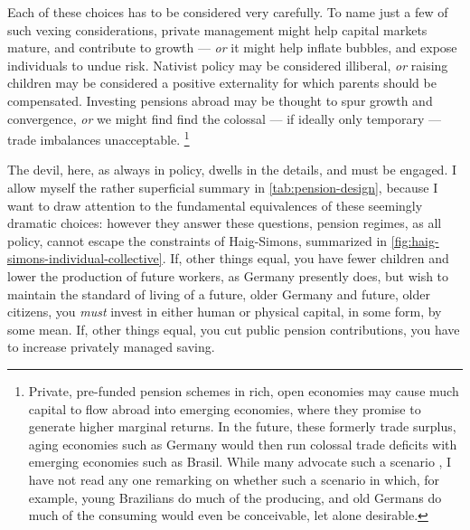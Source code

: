 Each of these choices has to be considered very carefully.
To name just a few of such vexing considerations, private management might help capital markets mature, and contribute to growth \citep[for example][155]{Barr2005a} --- \emph{or} it might help inflate bubbles, and expose individuals to undue risk.
Nativist policy may be considered illiberal, \emph{or} raising children may be considered a positive externality for which parents should be compensated.
Investing pensions abroad may be thought to spur growth and convergence, \emph{or} we might find find the colossal --- if ideally only temporary --- trade imbalances unacceptable.
\footnote{
	Private, pre-funded pension schemes in rich, open economies may cause much capital to flow abroad into emerging economies, where they promise to generate higher marginal returns.
	In the future, these formerly trade surplus, aging economies such as Germany would then run colossal trade deficits with emerging economies such as Brasil.
	While many advocate such a scenario \citep[for example,][176]{Borsch-Supan2003}, I have not read any one remarking on whether such a scenario in which, for example, young Brazilians do much of the producing, and old Germans do much of the consuming would even be conceivable, let alone desirable.
}

The devil, here, as always in policy, dwells in the details, and must be engaged.
I allow myself the rather superficial summary in \autoref{tab:pension-design}, because I want to draw attention to the fundamental equivalences of these seemingly dramatic choices:
however they answer these questions, pension regimes, as all policy, cannot escape the constraints of Haig-Simons, summarized in \autoref{fig:haig-simons-individual-collective}.
If, other things equal, you have fewer children and lower the production of future workers, as Germany presently does, but wish to maintain the standard of living of a future, older Germany and future, older citizens, you \emph{must} invest in either human or physical capital, in some form, by some mean.
If,  other things equal, you cut public pension contributions, you have to increase privately managed saving.


